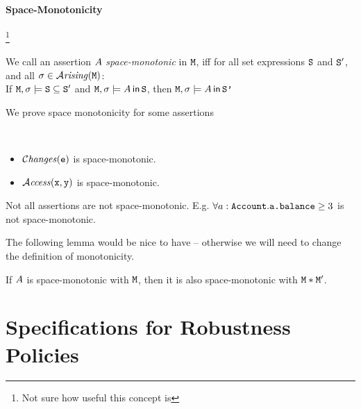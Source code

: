 \documentclass[acmsmall,screen]{acmart}
\begin{document}
\paragraph{Space-Monotonicity}\footnote{Not sure how useful this concept is}

\begin{definition}
We call an assertion $A$ {\em space-monotonic} in ${\mbox{\tt{M}}}$, iff for all set expressions ${\mbox{\tt{S}}}$ and  ${\mbox{\tt{S}}}'$,
 and all $\sigma\in{\mathcal{A}}\textrm{\textit{rising}}({{\mbox{\tt{M}}}})$:
 \\
  If  ${\mbox{\tt{M}}},\sigma\models  {\mbox{\tt{S}}} \subseteq {\mbox{\tt{S}}}'$ and ${\mbox{\tt{M}}},\sigma\models  A\,{\bf{\sf {in}}}\, {\mbox{\tt{S}}}$, then
${\mbox{\tt{M}}},\sigma\models  A\,{\bf{\sf {in}}}\,  {\mbox{\tt{S'}}}$
\end{definition}

We prove space monotonicity for some assertions

\begin{lemma}
$ ~ $

\begin{itemize}
\item
${\mathcal{C}\textrm{\textit{hanges}}({{\mbox{\tt{e}}}})} $ is space-monotonic.
\item
${\mathcal{A}}\textrm{\textit{ccess}}({\mbox{\tt{x}}},{\mbox{\tt{y}}})$ is space-monotonic.

\end{itemize}
\end{lemma}

Not all assertions  are not space-monotonic. E.g. $\forall a:{\mbox{\tt{Account}}}.{\mbox{\tt{a.balance}}}\geq 3$ is not space-monotonic.


The following lemma would be nice to have -- otherwise we will need to change the definition of monotonicity.

\begin{lemma}
If $A$ is space-monotonic with ${\mbox{\tt{M}}}$, then it is also space-monotonic with ${\mbox{\tt{M}}}*{\mbox{\tt{M}}}'$.
\end{lemma}


 \section{Specifications for Robustness Policies}
\end{document}
